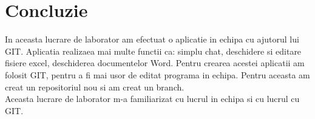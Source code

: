 \section*{Concluzie}


In aceasta lucrare de laborator am efectuat o aplicatie in echipa cu ajutorul lui GIT. Aplicatia realizaea mai multe functii ca: simplu chat, deschidere si editare fisiere excel, deschiderea documentelor Word. Pentru crearea acestei aplicatii am folosit GIT, pentru a fi mai usor de editat programa in echipa. Pentru aceasta am creat un repositoriul nou si am creat un branch.\\
Aceasta lucrare de laborator m-a familiarizat cu lucrul in echipa si cu lucrul cu GIT.

\clearpage